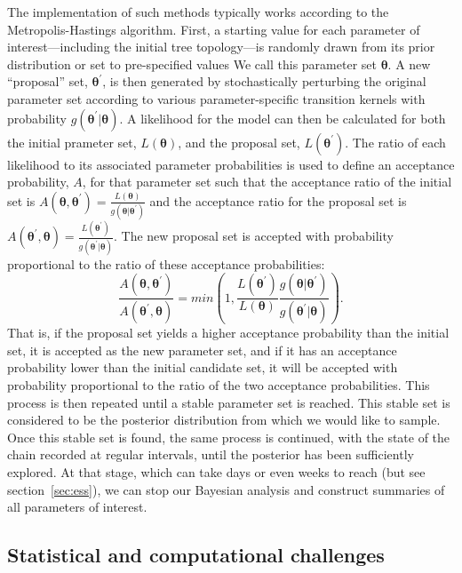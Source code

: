 The implementation of such methods typically works according to the Metropolis-Hastings algorithm\cite{metropolis1953equation, hastings1970monte}.
First, a starting value for each parameter of interest---including the initial tree topology---is randomly drawn from its prior distribution or set to pre-specified values
We call this parameter set $\mathbf{\theta}$.
A new ``proposal'' set, $\mathbf{\theta^\prime}$, is then generated by stochastically perturbing the original parameter set according to various parameter-specific transition kernels with probability $g(\mathbf{\theta^\prime}\vert\mathbf{\theta})$.
A likelihood for the model can then be calculated for both the initial prameter set, $L(\mathbf{\theta})$, and the proposal set, $L(\mathbf{\theta^{\prime}})$.
The ratio of each likelihood to its associated parameter probabilities is used to define an acceptance probability, $A$, for that parameter set such that the acceptance ratio of the initial set is $A(\mathbf{\theta}, \mathbf{\theta^{\prime}})=\frac{L(\mathbf{\theta})}{g(\mathbf{\theta}\vert\mathbf{\theta^\prime})}$ and the acceptance ratio for the proposal set is $A(\mathbf{\theta^\prime}, \mathbf{\theta})=\frac{L(\mathbf{\theta^\prime})}{g(\mathbf{\theta^\prime}\vert\mathbf{\theta})}$.
The new proposal set is accepted with probability proportional to the ratio of these acceptance probabilities:
$$
\frac{A(\mathbf{\theta}, \mathbf{\theta^{\prime}})}{A(\mathbf{\theta^\prime}, \mathbf{\theta})} = min(1,\frac{L(\mathbf{\theta^\prime})}{L(\mathbf{\theta})}\frac{g(\mathbf{\theta}\vert\mathbf{\theta^\prime})}{g(\mathbf{\theta^\prime}\vert\mathbf{\theta})}).
$$
That is, if the proposal set yields a higher acceptance probability than the initial set, it is accepted as the new parameter set, and if it has an acceptance probability lower than the initial candidate set, it will be accepted with probability proportional to the ratio of the two acceptance probabilities.
This process is then repeated until a stable parameter set is reached.
This stable set is considered to be the posterior distribution from which we would like to sample.
Once this stable set is found, the same process is continued, with the state of the chain recorded at regular intervals, until the posterior has been sufficiently explored.
At that stage, which can take days or even weeks to reach (but see section~\ref{sec:ess}), we can stop our Bayesian analysis and construct summaries of all parameters of interest.

\subsection{Statistical and computational challenges}


